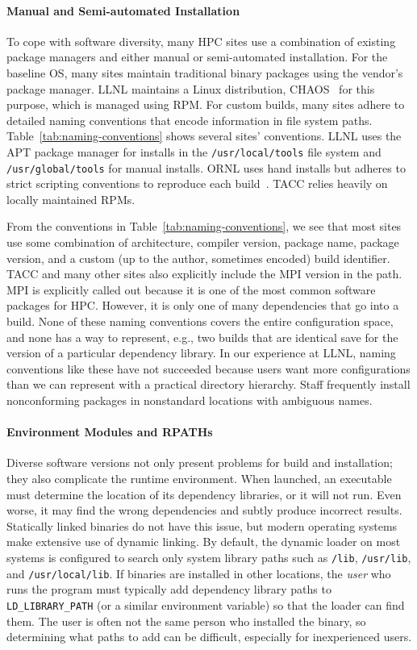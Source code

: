 \paragraph{Manual and Semi-automated Installation}

To cope with software diversity, many HPC sites use a combination of existing
package managers and either manual or semi-automated installation.
For the baseline OS, many sites maintain traditional binary
packages using the vendor's package manager. LLNL maintains a Linux
distribution, CHAOS~\cite{chaos} for this purpose, which is managed using RPM.
%
For custom builds, many sites adhere to detailed naming conventions
that encode information in file system paths.
Table~\ref{tab:naming-conventions} shows several sites' conventions.
LLNL uses the APT package manager for installs
in the {\tt /usr/local/tools} file system and {\tt /usr/global/tools}
for manual installs.
ORNL uses hand installs but adheres to strict scripting conventions
to reproduce each build~\cite{jones+:cug08}.
TACC relies heavily on locally maintained RPMs.

From the conventions in Table~\ref{tab:naming-conventions},
we see that most sites use some combination of architecture, compiler version,
package name, package version, and a custom (up to the author, sometimes
encoded) build identifier.  TACC and many other sites also explicitly
include the MPI version in the path. MPI is explicitly called out
because it is one of the most common software packages for HPC.
However, it is only one of many dependencies that go into a build.
None of these naming conventions covers the entire configuration
space, and none has a way to represent, e.g., two builds that are identical
save for the version of a particular dependency library.  In our experience
at LLNL, naming conventions like these have not succeeded because
users want more configurations than we can represent with a practical
directory hierarchy. Staff frequently install nonconforming packages
in nonstandard locations with ambiguous names.

\paragraph{Environment Modules and RPATHs}\label{sec:env-rpath}

Diverse software versions not only present problems for build and installation;
they also complicate the runtime environment. When launched, an executable
must determine the location of its dependency libraries, or it will not run.
Even worse, it may find the wrong dependencies and subtly produce incorrect results.
Statically linked binaries do not have this issue, but modern
operating systems make extensive use of dynamic linking.
By default, the dynamic loader on most systems is configured to search only
system library paths such as {\tt /lib}, {\tt /usr/lib}, and
{\tt /usr/local/lib}.  If binaries are installed in other locations, the
{\it user} who runs the program must typically add dependency library paths to
{\tt LD\_LIBRARY\_PATH} (or a similar environment variable) so that the loader
can find them.  The user is often not the same person who installed the binary,
so determining what paths to add can be difficult, especially for inexperienced users.

